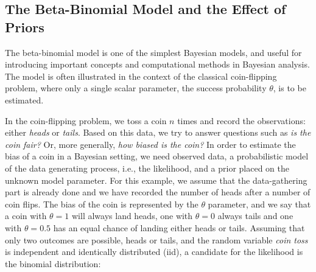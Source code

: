 
\subsection{The Beta-Binomial Model and the Effect of Priors}\label{sec:coin_flipping}

The beta-binomial model is one of the simplest Bayesian models, and useful for introducing important concepts and computational methods in Bayesian analysis. The model is often illustrated in the context of the classical coin-flipping problem, where only a single scalar parameter, the success probability $\theta$, is to be estimated. 

In the coin-flipping problem, we toss a coin $n$ times and record the observations: either \textit{heads} or \textit{tails}. Based on this data, we try to answer questions such as \textit{is the coin fair?} Or, more generally, \textit{how biased is the coin?} In order to estimate the bias of a coin in a Bayesian setting, we need observed data, a probabilistic model of the data generating process, i.e., the likelihood, and a prior placed on the unknown model parameter. For this example, we assume that the data-gathering part is already done and we have recorded the number of heads after a number of coin flips. The bias of the coin is represented by the $\theta$ parameter, and we say that a coin with $\theta=1$ will always land heads, one with $\theta=0$ always tails and one with $\theta=0.5$ has an equal chance of landing either heads or tails. Assuming that only two outcomes are possible, heads or tails, and the random variable \textit{coin toss} is independent and identically distributed (iid), a candidate for the likelihood is the binomial distribution: 

